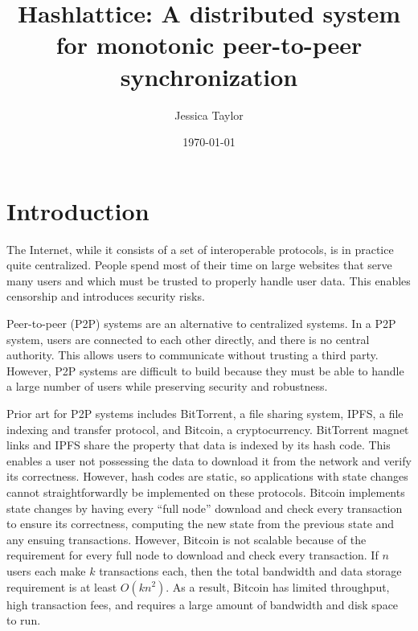 \documentclass{article}
\title{Hashlattice: A distributed system for monotonic peer-to-peer synchronization}
\author{Jessica Taylor}
\date{\today}
\begin{document}
  \newcommand{\checkelem}{\ensuremath{\mathsf{check\_elem}}}
  \newcommand{\join}{\ensuremath{\mathsf{join}}}
  \newcommand{\partialto}{\hookrightarrow}
  \newcommand{\hashlookup}{\ensuremath{\mathsf{hash\_lookup}}}
  \newcommand{\datacomputationlookup}{\ensuremath{\mathsf{data\_computation\_lookup}}}
  \newcommand{\latticelookup}{\ensuremath{\mathsf{lattice\_lookup}}}
  \newcommand{\latticecomputationlookup}{\ensuremath{\mathsf{lattice\_computation\_lookup}}}
  \newcommand{\hashput}{\ensuremath{\mathsf{hash\_put}}}
  \newcommand{\evaldatacomputation}{\ensuremath{\mathsf{eval\_data\_computation}}}
  \newcommand{\transport}{\ensuremath{\mathsf{transport}}}
  \newcommand{\evallatticecomputation}{\ensuremath{\mathsf{eval\_lattice\_computation}}}

  \maketitle
  
  \section{Introduction}
    The Internet, while it consists of a set of interoperable protocols, is in practice quite centralized. People spend most of their time on large websites that serve many users and which must be trusted to properly handle user data. This enables censorship and introduces security risks.

    Peer-to-peer (P2P) systems are an alternative to centralized systems. In a P2P system, users are connected to each other directly, and there is no central authority. This allows users to communicate without trusting a third party. However, P2P systems are difficult to build because they must be able to handle a large number of users while preserving security and robustness.

    Prior art for P2P systems includes BitTorrent, a file sharing system, IPFS, a file indexing and transfer protocol, and Bitcoin, a cryptocurrency. BitTorrent magnet links and IPFS share the property that data is indexed by its hash code. This enables a user not possessing the data to download it from the network and verify its correctness. However, hash codes are static, so applications with state changes cannot straightforwardly be implemented on these protocols. Bitcoin implements state changes by having every ``full node'' download and check every transaction to ensure its correctness, computing the new state from the previous state and any ensuing transactions. However, Bitcoin is not scalable because of the requirement for every full node to download and check every transaction. If $n$ users each make $k$ transactions each, then the total bandwidth and data storage requirement is at least $O(kn^2)$. As a result, Bitcoin has limited throughput, high transaction fees, and requires a large amount of bandwidth and disk space to run.
\end{document}

